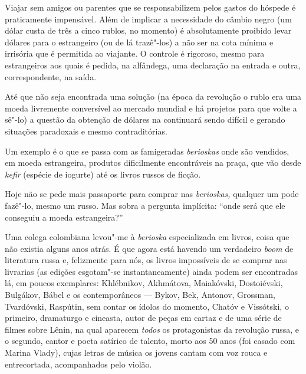 Viajar sem amigos ou parentes que se responsabilizem pelos gastos do
hóspede é praticamente impensável. Além de implicar a necessidade do
câmbio negro (um dólar custa de três a cinco rublos, no momento) é
absolutamente proibido levar dólares para o estrangeiro (ou de lá
trazê"-los) a não ser na cota mínima e irrisória que é permitida ao
viajante. O controle é rigoroso, mesmo para estrangeiros aos quais é
pedida, na alfândega, uma declaração na entrada e outra, correspondente,
na saída.

Até que não seja encontrada uma solução (na época da revolução o rublo
era uma moeda livremente conversível ao mercado mundial e há projetos
para que volte a sê"-lo) a questão da obtenção de dólares na 
continuará sendo difícil e gerando situações paradoxais e mesmo
contraditórias.

Um exemplo é o que se passa com as famigeradas \emph{berioskas} onde são
vendidos, em moeda estrangeira, produtos dificilmente encontráveis na
praça, que vão desde \emph{kefir} (espécie de iogurte) até os livros
russos de ficção.

Hoje não se pede mais passaporte para comprar nas \emph{berioskas,}
qualquer um pode fazê"-lo, mesmo um russo. Mas sobra a pergunta
implícita: ``onde será que ele conseguiu a moeda estrangeira?''

Uma colega colombiana levou"-me à \emph{berioska} especializada em
livros, coisa que não existia alguns anos atrás. É que agora está
havendo um verdadeiro \emph{boom} de literatura russa e, felizmente para
nós, os livros impossíveis de se comprar nas livrarias (as edições
esgotam"-se instantaneamente) ainda podem ser encontradas lá, em poucos
exemplares: Khlébnikov, Akhmátova, Maiakóvski, Dostoiévski, Bulgákov,
Bábel e os contemporâneos --- Bykov, Bek, Antonov, Grossman, Tvardóvski,
Raspútin, sem contar os ídolos do momento, Chatóv e Vissótski, o
primeiro, dramaturgo e cineasta, autor de peças em cartaz e de uma série
de filmes sobre Lênin, na qual aparecem \emph{todos} os protagonistas da
revolução russa, e o segundo, cantor e poeta satírico de talento, morto
aos 50 anos (foi casado com Marina Vlady), cujas letras de música os
jovens cantam com voz rouca e entrecortada, acompanhados pelo violão.

